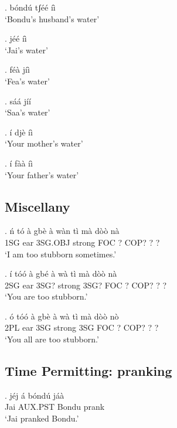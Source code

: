 \documentclass{assets/fieldnotes}
\begin{document}

\ex. bóndú tʃéé íì \\
`Bondu's husband's water' 


\ex. jéé íì \\
`Jai's water'


\ex. féà jíì \\
`Fea's water'


\ex. sáá jíí \\
`Saa's water'

\ex. í djè íì \\
`Your mother's water'

\ex. í fàà íì \\
`Your father's water'

\subsection{Miscellany}

\exg. ń tó à gbè à wàn tì mà dòò nà \\
1SG ear 3SG.OBJ strong FOC ? COP? ? ? \\
`I am too stubborn sometimes.'

\jmt{[o] + [i]}

\exg. í tóó à gbé à wà tì mà dòò nà \\
2SG ear 3SG? strong 3SG? FOC ? COP? ? ? \\
`You are too stubborn.'

\ex. ó tóó à gbè à wà tì mà dòò nò \\
2PL ear 3SG strong 3SG FOC ? COP? ? ? \\
`You all are too stubborn.'

\subsection{Time Permitting: pranking}

\exg. jéj á bóndú jáà \\
Jai AUX.PST Bondu prank \\
`Jai pranked Bondu.'
\end{document}
